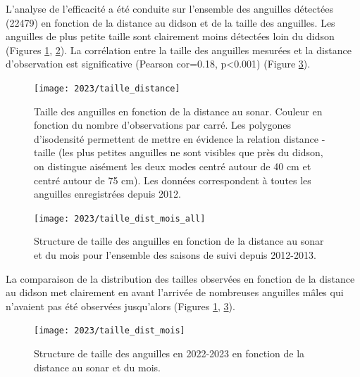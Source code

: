 \documentclass[11pt,twocolumn,titlepage,twoside]{article}
\begin{document}
L'analyse de l'efficacité a été conduite sur l'ensemble des anguilles détectées
(\num{22479}) en
fonction de la distance au didson et de la taille des anguilles. 
Les anguilles de plus petite taille sont clairement moins détectées loin du
didson (Figures \ref{taille_distance}, \ref{taille_dist_mois_all}).
La corrélation entre la taille des anguilles mesurées
et la distance d'observation est significative (Pearson
cor=\num{0.18}, p<0.001) (Figure
\ref{taille_dist_mois}).


\begin{figure}[htbp]
  \centering
  \texttt{[image: 2023/taille\_distance]}
  \caption[Taille des anguilles]{Taille des anguilles en fonction de la
  distance au sonar. Couleur en fonction du nombre d'observations par carré.
  Les polygones d'isodensité permettent de mettre en évidence la relation
  distance - taille (les plus petites anguilles ne sont visibles que près du
  didson, on distingue aisément les deux modes  centré autour de 40 cm
  et  centré autour de 75 cm).
  Les données correspondent à toutes les anguilles enregistrées depuis 2012.}
  \label{taille_distance}
\end{figure}
\begin{figure}[htbp]
  \centering
  \texttt{[image: 2023/taille\_dist\_mois\_all]}
  \caption[Taille des anguilles toutes années]{Structure de taille des anguilles
  en fonction de la distance au sonar et du mois pour l'ensemble des saisons de
  suivi depuis 2012-2013.}
  \label{taille_dist_mois_all}
\end{figure}
La comparaison de la distribution des tailles observées en fonction de la
distance au didson met clairement en avant l'arrivée de nombreuses anguilles
mâles qui n'avaient pas été observées jusqu'alors (Figures
\ref{taille_distance}, \ref{taille_dist_mois}).
\begin{figure}[htbp]
  \centering
  \texttt{[image: 2023/taille\_dist\_mois]}
  \caption[Taille des anguilles 2022-2023]{Structure de taille des
  anguilles en 2022-2023 en fonction de la distance au sonar et du mois.}
  \label{taille_dist_mois}
\end{figure}
\end{document}

